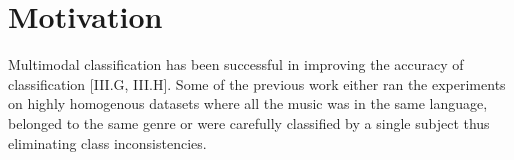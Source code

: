 \chapter{Motivation}

Multimodal classification has been successful in improving the accuracy of classification 
[III.G, III.H]. Some of the previous work either ran the experiments on highly homogenous 
datasets where all the music was in the same language, belonged to the same genre or 
were carefully classified by a single subject thus eliminating class inconsistencies.  


